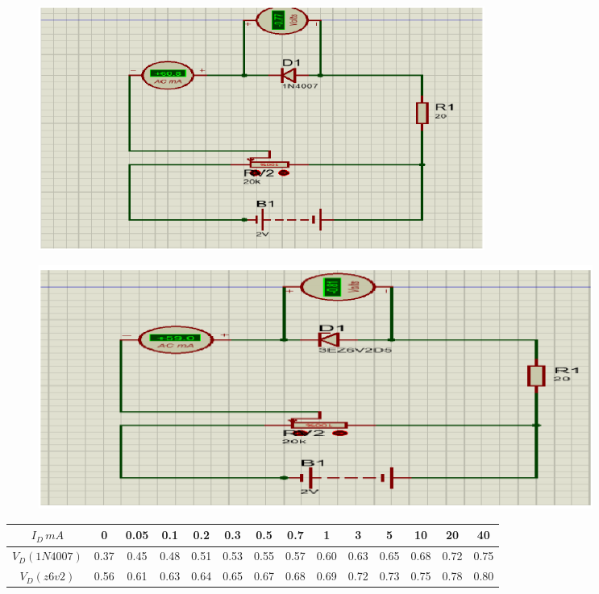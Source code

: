 \documentclass[12pt]{article}
\begin{document}
\begin{figure}[H]
	\begin{center}
		\includegraphics[width=\textwidth, height=8cm]{./images/7.3}
	\end{center}
\end{figure}

\begin{figure}[H]
	\begin{center}
		\includegraphics[width=\textwidth, height=8cm]{./images/7.4}
	\end{center}
\end{figure}

\begin{latin}
\begin{table}[H]
\begin{adjustbox}{width=\textwidth}
\begin{tabular}{|c|c|c|c|c|c|c|c|c|c|c|c|c|c|}
\hline
$I_D \, mA$ & 0 & 0.05 & 0.1 & 0.2 & 0.3 & 0.5 & 0.7 & 1 & 3 & 5 & 10 & 20 & 40 \\
\hline
\hline
$V_D (1N 4007) $ &
0.37 &
0.45 & 
0.48 & 
0.51 & 
0.53 & 
0.55 & 
0.57 & 
0.60 & 
0.63 & 
0.65 & 
0.68 & 
0.72 & 
0.75 \\
\hline
$V_D (z6v2) $ &
0.56 &
0.61 & 
0.63 & 
0.64 & 
0.65 & 
0.67 & 
0.68 & 
0.69 & 
0.72 & 
0.73 & 
0.75 & 
0.78 & 
0.80 \\
\hline
\end{tabular}
\end{adjustbox}
\end{table}
\end{latin}
\end{document}
